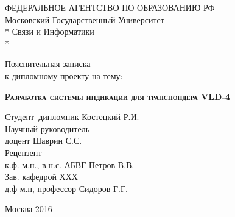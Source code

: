 \begin{titlepage}
  \newpage

  \begin{center}
    ФЕДЕРАЛЬНОЕ АГЕНТСТВО ПО ОБРАЗОВАНИЮ РФ \\
    \vspace{1cm}
    Московский Государственный Университет \\*
    Связи и Информатики \\*
    \hrulefill
  \end{center}


  \vspace{8em}

  \begin{center}
    \Large Пояснительная записка \\ к дипломному проекту на тему:
  \end{center}

  \vspace{2.5em}

  \begin{center}
    \textsc{\textbf{Разработка системы индикации для транспондера VLD-4}}
  \end{center}

  \vspace{6em}

  \begin{flushleft}
    Студент--дипломник \hrulefill Костецкий Р.И. \\
    \vspace{1.5em}
    Научный руководитель \\
    доцент \hrulefill Шаврин С.С.\\
    \vspace{1.5em}
    Рецензент \\
    к.ф.-м.н., в.н.с. АБВГ \hrulefill Петров В.В.\\
    \vspace{1.5em}
    Зав. кафедрой ХХХ \\
    д.ф-м.н, профессор \hrulefill Сидоров Г.Г.
  \end{flushleft}

  \vspace{\fill}

  \begin{center}
    Москва 2016
  \end{center}

\end{titlepage}